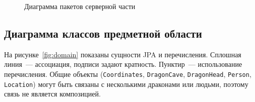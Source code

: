 \documentclass[12pt,a4paper]{article}
\begin{document}
\begin{figure}[H]
\caption{Диаграмма пакетов серверной части}
\label{fig:packages}
\end{figure}

\subsection{Диаграмма классов предметной области}

На рисунке~\ref{fig:domain} показаны сущности JPA и перечисления. Сплошная линия~--- ассоциация, подписи задают кратность. Пунктир~--- использование перечисления. Общие объекты (\texttt{Coordinates}, \texttt{DragonCave}, \texttt{DragonHead}, \texttt{Person}, \texttt{Location}) могут быть связаны с несколькими драконами или людьми, поэтому связь не является композицией.
\end{document}
